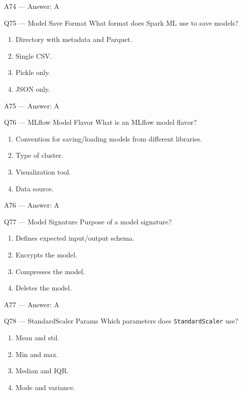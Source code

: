 \documentclass[aspectratio=169,10pt]{beamer}
\begin{document}
	\begin{frame}{A74 — Answer: A}
	\end{frame}
	
	\begin{frame}{Q75 — Model Save Format}
		What format does Spark ML use to save models?
		\begin{enumerate}[label=\Alph*.]
			\item Directory with metadata and Parquet.
			\item Single CSV.
			\item Pickle only.
			\item JSON only.
		\end{enumerate}
	\end{frame}
	
	\begin{frame}{A75 — Answer: A}
	\end{frame}
	
	\begin{frame}{Q76 — MLflow Model Flavor}
		What is an MLflow model flavor?
		\begin{enumerate}[label=\Alph*.]
			\item Convention for saving/loading models from different libraries.
			\item Type of cluster.
			\item Visualization tool.
			\item Data source.
		\end{enumerate}
	\end{frame}
	
	\begin{frame}{A76 — Answer: A}
	\end{frame}
	
	\begin{frame}{Q77 — Model Signature}
		Purpose of a model signature?
		\begin{enumerate}[label=\Alph*.]
			\item Defines expected input/output schema.
			\item Encrypts the model.
			\item Compresses the model.
			\item Deletes the model.
		\end{enumerate}
	\end{frame}
	
	\begin{frame}{A77 — Answer: A}
	\end{frame}
	
	\begin{frame}{Q78 — StandardScaler Params}
		Which parameters does \texttt{StandardScaler} use?
		\begin{enumerate}[label=\Alph*.]
			\item Mean and std.
			\item Min and max.
			\item Median and IQR.
			\item Mode and variance.
		\end{enumerate}
	\end{frame}
	
\end{document}
